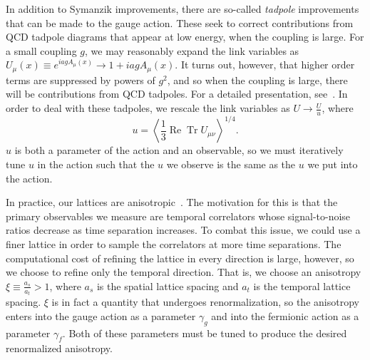 In addition to Symanzik improvements, there are so-called \emph{tadpole} improvements~\cite{Lepage:1992xa} that can be made to the gauge action. These seek to correct contributions from QCD tadpole diagrams that appear at low energy, when the coupling is large. For a small coupling $g$, we may reasonably expand the link variables as $U_{\mu}(x) \equiv e^{i a g A_{\mu}(x)} \rightarrow 1+i a g A_{\mu}(x)$. It turns out, however, that higher order terms are suppressed by powers of $g^2$, and so when the coupling is large, there will be contributions from QCD tadpoles. For a detailed presentation, see~\cite{Lepage:1992xa}. In order to deal with these tadpoles, we rescale the link variables as $U \rightarrow \frac{U}{u}$, where
\begin{equation}
    u=\left\langle\frac{1}{3} \operatorname{Re} \operatorname{Tr} U_{\mu \nu}\right\rangle^{1 / 4}.
\end{equation}
$u$ is both a parameter of the action and an observable, so we must iteratively tune $u$ in the action such that the $u$ we observe is the same as the $u$ we put into the action.

In practice, our lattices are anisotropic~\cite{Edwards:2008ja, Lin:2008pr}. The motivation for this is that the primary observables we measure are temporal correlators whose signal-to-noise ratios decrease as time separation increases. To combat this issue, we could use a finer lattice in order to sample the correlators at more time separations. The computational cost of refining the lattice in every direction is large, however, so we choose to refine only the temporal direction. That is, we choose an anisotropy $\xi \equiv \frac{a_s}{a_t} > 1$, where $a_s$ is the spatial lattice spacing and $a_t$ is the temporal lattice spacing. $\xi$ is in fact a quantity that undergoes renormalization, so the anisotropy enters into the gauge action as a parameter $\gamma_g$ and into the fermionic action as a parameter $\gamma_f$. Both of these parameters must be tuned to produce the desired renormalized anisotropy.

